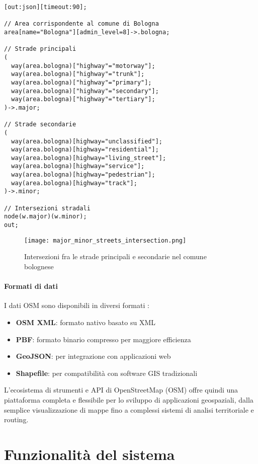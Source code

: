 \begin{lstlisting}[caption={Query Overlpass QL di esempio}, label=lst:esempio]
[out:json][timeout:90];

// Area corrispondente al comune di Bologna 
area[name="Bologna"][admin_level=8]->.bologna;

// Strade principali
(
  way(area.bologna)["highway"="motorway"];
  way(area.bologna)["highway"="trunk"];
  way(area.bologna)["highway"="primary"];
  way(area.bologna)["highway"="secondary"];
  way(area.bologna)["highway"="tertiary"];
)->.major;

// Strade secondarie
(
  way(area.bologna)[highway="unclassified"];
  way(area.bologna)[highway="residential"];
  way(area.bologna)[highway="living_street"];
  way(area.bologna)[highway="service"];
  way(area.bologna)[highway="pedestrian"];
  way(area.bologna)[highway="track"];
)->.minor;

// Intersezioni stradali
node(w.major)(w.minor);
out;
\end{lstlisting}

\begin{figure}[H]
  \centering
  \texttt{[image: major\_minor\_streets\_intersection.png]}
  \caption{Intersezioni fra le strade principali e secondarie nel comune bolognese}
  \label{fig:streets-intersections}
\end{figure}

\paragraph{Formati di dati}
I dati OSM sono disponibili in diversi formati \cite{geoapify2024}:
\begin{itemize}
\item \textbf{OSM XML}: formato nativo basato su XML
\item \textbf{PBF}: formato binario compresso per maggiore efficienza
\item \textbf{GeoJSON}: per integrazione con applicazioni web
\item \textbf{Shapefile}: per compatibilità con software GIS tradizionali
\end{itemize}

L'ecosistema di strumenti e API di OpenStreetMap (OSM) offre quindi una piattaforma completa e flessibile per lo sviluppo di applicazioni geospaziali, dalla semplice visualizzazione di mappe fino a complessi sistemi di analisi territoriale e routing.

\section{Funzionalità del sistema}

